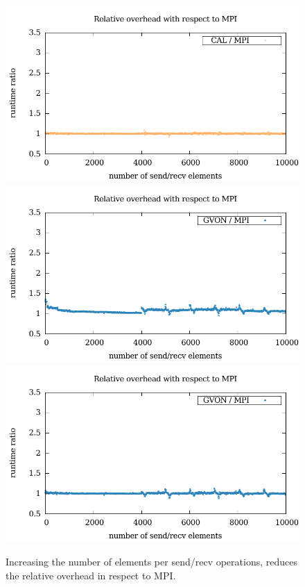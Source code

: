 \begin{figure}[H]
\begin{minipage}[t]{0.5\textwidth}
  \end{minipage}%
  \begin{minipage}[t]{0.5\textwidth}
    \includegraphics[width=\textwidth]{plots/50_nsize_overhead_cal_laser}
    \includegraphics[width=\textwidth]{plots/50_nsize_overhead_gvon_laser}
    \includegraphics[width=\textwidth]{plots/50_nsize_one_lookup_overhead_gvon_laser}
  \end{minipage}%
  \caption{Increasing the number of elements per send/recv operations,
    reduces the relative overhead in respect to MPI.}
  \label{fig:nsize_kepler}
\end{figure}

